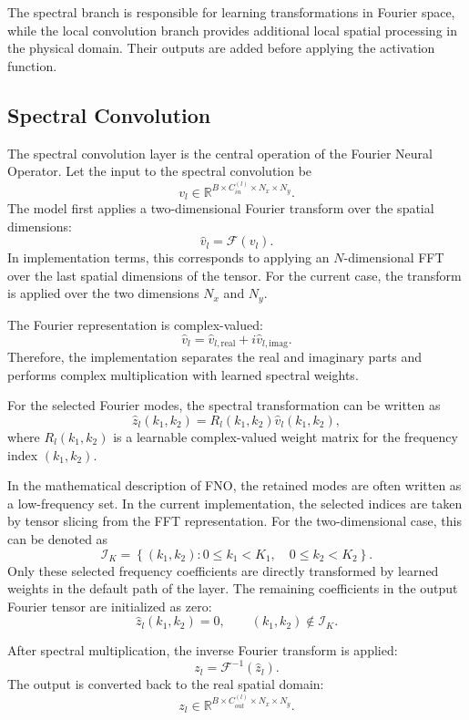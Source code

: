 \documentclass[14pt]{extarticle}
\begin{document}
The spectral branch is responsible for learning transformations in Fourier space, while the local convolution branch provides additional local spatial processing in the physical domain. Their outputs are added before applying the activation function.

\subsection{Spectral Convolution}

The spectral convolution layer is the central operation of the Fourier Neural Operator. Let the input to the spectral convolution be
\[
v_l
\in
\mathbb{R}^{B \times C_{in}^{(l)} \times N_x \times N_y}.
\]
The model first applies a two-dimensional Fourier transform over the spatial dimensions:
\[
\hat{v}_l
=
\mathcal{F}(v_l).
\]
In implementation terms, this corresponds to applying an \(N\)-dimensional FFT over the last spatial dimensions of the tensor. For the current case, the transform is applied over the two dimensions \(N_x\) and \(N_y\).

The Fourier representation is complex-valued:
\[
\hat{v}_l
=
\hat{v}_{l,\mathrm{real}}
+
i\hat{v}_{l,\mathrm{imag}}.
\]
Therefore, the implementation separates the real and imaginary parts and performs complex multiplication with learned spectral weights.

For the selected Fourier modes, the spectral transformation can be written as
\[
\hat{z}_l(k_1,k_2)
=
R_l(k_1,k_2)
\hat{v}_l(k_1,k_2),
\]
where \(R_l(k_1,k_2)\) is a learnable complex-valued weight matrix for the frequency index \((k_1,k_2)\).

In the mathematical description of FNO, the retained modes are often written as a low-frequency set. In the current implementation, the selected indices are taken by tensor slicing from the FFT representation. For the two-dimensional case, this can be denoted as
\[
\mathcal{I}_K
=
\left\{
(k_1,k_2)
:
0 \leq k_1 < K_1,
\quad
0 \leq k_2 < K_2
\right\}.
\]
Only these selected frequency coefficients are directly transformed by learned weights in the default path of the layer. The remaining coefficients in the output Fourier tensor are initialized as zero:
\[
\hat{z}_l(k_1,k_2)
=
0,
\qquad
(k_1,k_2) \notin \mathcal{I}_K.
\]

After spectral multiplication, the inverse Fourier transform is applied:
\[
z_l
=
\mathcal{F}^{-1}
\left(
\hat{z}_l
\right).
\]
The output is converted back to the real spatial domain:
\[
z_l
\in
\mathbb{R}^{B \times C_{out}^{(l)} \times N_x \times N_y}.
\]
\end{document}
